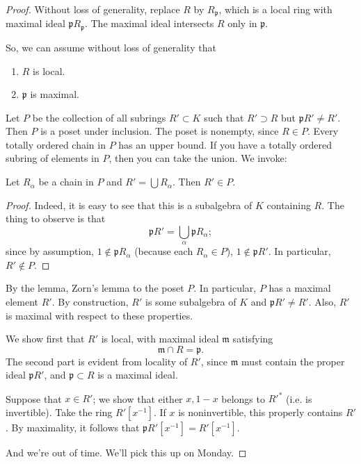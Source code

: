\begin{proof} 
Without loss of generality, replace $R$ by $R_{\mathfrak{p}}$, which is a local
ring with maximal ideal $\mathfrak{p}R_{\mathfrak{p}}$. The maximal ideal
intersects $R$ only in $\mathfrak{p}$.

So, we can assume without loss of generality that 
\begin{enumerate}
\item $R$ is local. 
\item $\mathfrak{p}$ is maximal.
\end{enumerate}

Let $P$ be the collection of all subrings $R' \subset K$ such that $R' \supset
R$ but $\mathfrak{p}R' \neq R'$.  Then $P$ is a poset under inclusion. The
poset is nonempty, since $R \in P$.  Every totally ordered chain in $P$ has an
upper bound.  If you have a totally ordered subring of elements in $P$, then
you can take the union.  
We invoke:
\begin{lemma} 
Let $R_\alpha$ be a chain in $P$ and $R' = \bigcup R_\alpha$. Then $R' \in P$.
\end{lemma} 
\begin{proof} 
Indeed, it is easy to see that this is a subalgebra of $K$ containing $R$. The
thing to observe is that 
\[ \mathfrak{p}R' = \bigcup_\alpha \mathfrak{p} R_\alpha  ;\]
since by assumption, $1 \notin \mathfrak{p}R_\alpha$ (because each $R_\alpha
\in P$), $1 \notin \mathfrak{p}R'$. In particular, $R' \notin P$.
\end{proof} 

By the lemma, Zorn's lemma to the poset $P$. In particular, $P$ has a maximal
element $R'$. By construction, $R'$ is some subalgebra of $K$ and
$\mathfrak{p}R' \neq R'$. Also, $R'$ is maximal with respect to these
properties.

We show first that $R'$ is local, with maximal ideal $\mathfrak{m}$ satisfying
\[ \mathfrak{m} \cap R = \mathfrak{p}.  \]
The second part is evident from locality of $R'$, since $\mathfrak{m} $ must contain
the proper ideal $\mathfrak{p}R'$, and $\mathfrak{p} \subset R$ is a maximal
ideal. 

Suppose that $x \in R'$; we show that either $x, 1-x$ belongs to $R'^*$ (i.e.
is invertible). Take the ring $R'[x^{-1}]$.  If $x$ is noninvertible, this
properly contains $R'$.  By maximality, it follows that $\mathfrak{p}R'[x^{-1}]
= R'[x^{-1}]$. 

And we're out of time. We'll pick this up on Monday. 

\end{proof} 

